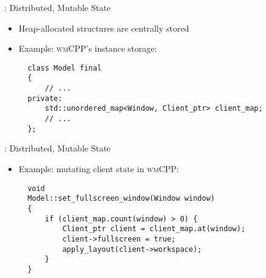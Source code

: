 \begin{frame}[fragile]{\underline{\cpp}: Distributed, Mutable State \hfill {\footnotesize \currentname}}


    \begin{itemize}

        \item Heap-allocated  structures are centrally stored

    \item Example: \textsc{wmCPP}'s  instance storage:\\[3pt]
\begin{verbatim}
  class Model final
  {
      // ...
  private:
      std::unordered_map<Window, Client_ptr> client_map;
      // ...
  };
\end{verbatim}

    \end{itemize}

    \vfill

\end{frame}

\begin{frame}[fragile]{\underline{\cpp}: Distributed, Mutable State \hfill {\footnotesize \currentname}}


    \begin{itemize}

    \item Example: mutating client state in \textsc{wmCPP}:\\[3pt]
\begin{verbatim}
  void
  Model::set_fullscreen_window(Window window)
  {
      if (client_map.count(window) > 0) {
          Client_ptr client = client_map.at(window);
          client->fullscreen = true;
          apply_layout(client->workspace);
      }
  }
\end{verbatim}

    \end{itemize}

    \vfill

\end{frame}

